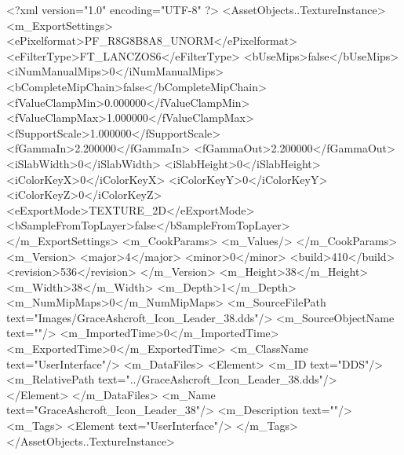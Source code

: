 <?xml version="1.0" encoding="UTF-8" ?>
<AssetObjects..TextureInstance>
	<m_ExportSettings>
		<ePixelformat>PF_R8G8B8A8_UNORM</ePixelformat>
		<eFilterType>FT_LANCZOS6</eFilterType>
		<bUseMips>false</bUseMips>
		<iNumManualMips>0</iNumManualMips>
		<bCompleteMipChain>false</bCompleteMipChain>
		<fValueClampMin>0.000000</fValueClampMin>
		<fValueClampMax>1.000000</fValueClampMax>
		<fSupportScale>1.000000</fSupportScale>
		<fGammaIn>2.200000</fGammaIn>
		<fGammaOut>2.200000</fGammaOut>
		<iSlabWidth>0</iSlabWidth>
		<iSlabHeight>0</iSlabHeight>
		<iColorKeyX>0</iColorKeyX>
		<iColorKeyY>0</iColorKeyY>
		<iColorKeyZ>0</iColorKeyZ>
		<eExportMode>TEXTURE_2D</eExportMode>
		<bSampleFromTopLayer>false</bSampleFromTopLayer>
	</m_ExportSettings>
	<m_CookParams>
		<m_Values/>
	</m_CookParams>
	<m_Version>
		<major>4</major>
		<minor>0</minor>
		<build>410</build>
		<revision>536</revision>
	</m_Version>
	<m_Height>38</m_Height>
	<m_Width>38</m_Width>
	<m_Depth>1</m_Depth>
	<m_NumMipMaps>0</m_NumMipMaps>
	<m_SourceFilePath text="Images/GraceAshcroft_Icon_Leader_38.dds"/>
	<m_SourceObjectName text=""/>
	<m_ImportedTime>0</m_ImportedTime>
	<m_ExportedTime>0</m_ExportedTime>
	<m_ClassName text="UserInterface"/>
	<m_DataFiles>
		<Element>
			<m_ID text="DDS"/>
			<m_RelativePath text="../GraceAshcroft_Icon_Leader_38.dds"/>
		</Element>
	</m_DataFiles>
	<m_Name text="GraceAshcroft_Icon_Leader_38"/>
	<m_Description text=""/>
	<m_Tags>
		<Element text="UserInterface"/>
	</m_Tags>
</AssetObjects..TextureInstance>
